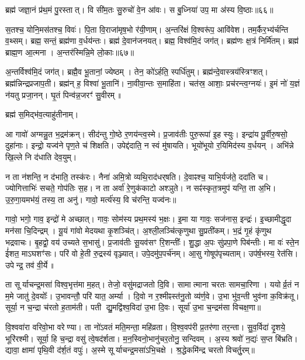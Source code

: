 ब्रह्म॑ जज्ञा॒नं प्र॑थ॒मं पु॒रस्तात्।
वि सी॑म॒तः सु॒रुचो॑ वे॒न आ॑वः।
स बु॒ध्निया॑ उप॒ मा अ॑स्य वि॒ष्ठाः॥६६॥

स॒तश्च॒ योनि॒मस॑तश्च॒ विवः॑।
पि॒ता वि॒राजा॑मृष॒भो र॑यी॒णाम्।
अ॒न्तरि॑क्षं वि॒श्वरू॑प॒ आवि॑वेश।
तम॒र्कैर॒भ्य॑र्चन्ति व॒थ्सम्।
ब्रह्म॒ सन्तं॒ ब्रह्म॑णा व॒र्धय॑न्तः।
ब्रह्म॑ दे॒वान॑जनयत्।
ब्रह्म॒ विश्व॑मि॒दं जग॑त्।
ब्रह्म॑णः क्ष॒त्रं निर्मि॑तम्।
ब्रह्म॑ ब्राह्म॒ण आ॒त्मना।
अ॒न्तर॑स्मिन्नि॒मे लो॒काः॥६७॥

अ॒न्तर्विश्व॑मि॒दं जग॑त्।
ब्रह्मै॒व भू॒तानां॒ ज्येष्ठम्।
तेन॒ को॑ऽर्\mbox{}हति॒ स्पर्धि॑तुम्।
ब्रह्म॑न्दे॒वास्त्रय॑स्त्रिꣳशत्।
ब्रह्म॑न्निन्द्रप्रजाप॒ती।
ब्रह्म॑न् ह॒ विश्वा॑ भू॒तानि॑।
ना॒वीवा॒न्तः स॒माहि॑ता।
चत॑स्र॒ आशाः॒ प्रच॑रन्त्व॒ग्नयः॑।
इ॒मं नो॑ य॒ज्ञं न॑यतु प्रजा॒नन्।
घृ॒तं पिन्व॑न्न॒जरꣳ॑ सु॒वीरम्॥

ब्रह्म॑ स॒मिद्भ॑व॒त्याहु॑तीनाम्।

आ गावो॑ अग्मन्नु॒त भ॒द्रम॑क्रन्।
सीद॑न्तु गो॒ष्ठे र॒णय॑न्त्व॒स्मे।
प्र॒जाव॑तीः पुरु॒रूपा॑ इ॒ह स्युः।
इन्द्रा॑य पू॒र्वीरु॒षसो॒ दुहा॑नाः।
इन्द्रो॒ यज्व॑ने पृण॒ते च॑ शिक्षति।
उपेद्द॑दाति॒ न स्वं मु॑षायति।
भूयो॑भूयो र॒यिमिद॑स्य व॒र्धयन्।
अभि॑न्ने खि॒ल्ले नि द॑धाति देव॒युम्।

न ता न॑शन्ति॒ न द॑भाति॒ तस्क॑रः।
नैना॑ अमि॒त्रो व्यथि॒राद॑धर्‌षति।
दे॒वाꣴश्च॒ याभि॒र्यज॑ते॒ ददा॑ति च।
ज्योगित्ताभिः॑ सचते॒ गोप॑तिः स॒ह।
न ता अर्वा॑ रे॒णुक॑काटो अश्ञुते।
न सꣴ॑स्कृत॒त्रमुप॑ यन्ति॒ ता अ॒भि।
उ॒रु॒गा॒यमभ॑यं॒ तस्य॒ ता अनु॑।
गावो॒ मर्त्य॑स्य॒ वि च॑रन्ति॒ यज्व॑नः॥

गावो॒ भगो॒ गाव॒ इन्द्रो॑ मे अच्छात्।
गावः॒ सोम॑स्य प्रथ॒मस्य॑ भ॒क्षः।
इ॒मा या गावः॒ सज॑नास॒ इन्द्रः॑।
इ॒च्छामीद्धृ॒दा मन॑सा चि॒दिन्द्रम्।
यू॒यं गा॑वो मेदयथा कृ॒शञ्चि॑त्।
अ॒श्ली॒लञ्चि॑त्कृणुथा सु॒प्रती॑कम्।
भ॒द्रं गृ॒हं कृ॑णुथ भद्रवाचः।
बृ॒हद्वो॒ वय॑ उच्यते स॒भासु॑।
प्र॒जाव॑तीः सू॒यव॑सꣳ रि॒शन्तीः᳚।
शु॒द्धा अ॒पः सु॑प्रपा॒णे पिब॑न्तीः।
मा वः॑ स्ते॒न ई॑शत॒ माऽघशꣳ॑सः।
परि॑ वो हे॒ती रु॒द्रस्य॑ वृञ्ज्यात्।
उपे॒दमु॑प॒पर्च॑नम्।
आ॒सु गोषूप॑पृच्यताम्।
उप॑र्\mbox{}ष॒भस्य॒ रेत॑सि।
उपेन्द्र॒ तव॑ वी॒र्ये॥

ता सूर्याचन्द्र॒मसा॑ विश्व॒भृत्त॑मा म॒हत्।
तेजो॒ वसु॑मद्राजतो दि॒वि।
सामात्माना चरतः सामचा॒रिणा।
ययोर्व्र॒तं न म॒मे जातु॑ दे॒वयोः᳚।
उ॒भावन्तौ॒ परि॑ यात॒ अर्म्या।
दि॒वो न र॒श्मीꣴस्त॑नु॒तो व्य॑र्ण॒वे।
उ॒भा भु॑व॒न्ती भुव॑ना क॒विक्र॑तू।
सूर्या॒ न च॒न्द्रा च॑रतो ह॒ताम॑ती।
पती द्यु॒मद्वि॑श्व॒विदा॑ उ॒भा दि॒वः।
सूर्या॑ उ॒भा च॒न्द्रम॑सा विचक्ष॒णा॥

वि॒श्ववा॑रा वरिवो॒भा वरेण्या।
ता नो॑ऽवतं मति॒मन्ता॒ महि॑व्रता।
वि॒श्व॒वप॑री प्र॒तर॑णा तर॒न्ता।
सु॒व॒र्विदा॑ दृ॒शये॒ भूरि॑रश्मी।
सूर्या॒ हि च॒न्द्रा वसु॑ त्वे॒षद॑र्\mbox{}शता।
म॒न॒स्विनो॒भानु॑चर॒तोनु॒ सन्दिवम्।
अ॒स्य श्रवो॑ न॒द्यः॑ स॒प्त बि॑भ्रति।
द्यावा॒ क्षामा॑ पृथि॒वी द॑र्\mbox{}श॒तं वपुः॑।
अ॒स्मे सूर्याचन्द्र॒मसा॑ऽभि॒चक्षे।
श्र॒द्धेकमि॑न्द्र चरतो विचर्तु॒रम्॥

